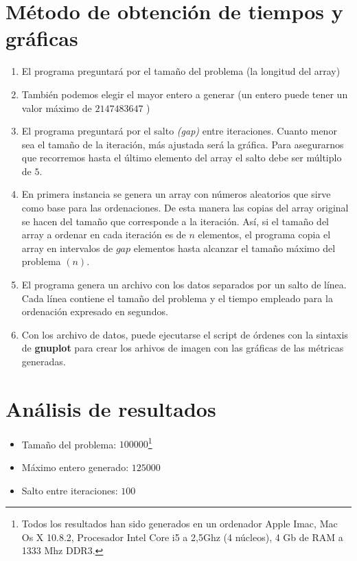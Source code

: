 \section{Método de obtención de tiempos y gráficas}
	\begin{enumerate}
		\item El programa preguntará por el tamaño del problema (la longitud del array)
		\item También podemos elegir el mayor entero a generar (un entero puede tener un valor 				máximo de $2147483647$ )
		\item El programa preguntará por el salto \emph{(gap)} entre iteraciones.  Cuanto menor 					sea el tamaño de la iteración, más ajustada será la gráfica.  Para asegurarnos que 					recorremos hasta el último elemento del array el salto debe ser múltiplo de $5$.
		\item En primera instancia se genera un array con números aleatorios que sirve como base 					para las ordenaciones.  De esta manera las copias del array original se hacen del 					tamaño que corresponde a la iteración.  Así, si el tamaño del array a ordenar en cada iteración es de $n$ 					elementos, el programa copia el array en intervalos de $gap$ elementos hasta alcanzar el tamaño máximo del problema $(n)$.
		\item El programa genera un archivo con los datos separados por un salto de línea.  Cada 					línea contiene el tamaño del problema y el tiempo empleado para la ordenación expresado 			en segundos.
		\item Con los archivo de datos, puede ejecutarse el script de órdenes con la sintaxis de 				\textbf{gnuplot} para crear los arhivos de imagen con las gráficas de las métricas 					generadas.
	\end{enumerate}


\section{Análisis de resultados}
\begin{itemize}
\item Tamaño del problema: $100000$\footnote{Todos los resultados han sido generados en un ordenador Apple Imac, Mac Os X 10.8.2, Procesador Intel Core i5 a 2,5Ghz (4 núcleos), 4 Gb de RAM a 1333 Mhz DDR3.}
\item Máximo entero generado: $125000$
\item Salto entre iteraciones: $100$
\end{itemize}
\newpage
